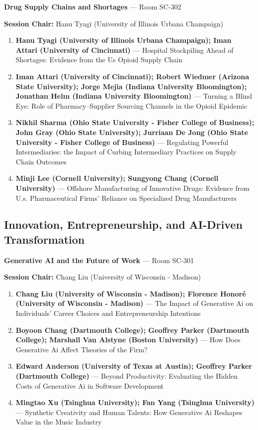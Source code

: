 \documentclass[
  10pt,
  letterpaper,
  DIV=11,
  numbers=noendperiod]{scrartcl}
\begin{document}
\textbf{Drug Supply Chains and Shortages} --- Room SC-302

\textbf{Session Chair:} Hanu Tyagi (University of Illinois Urbana
Champaign)

\begin{enumerate}
\def\labelenumi{\arabic{enumi}.}
\item
  \textbf{Hanu Tyagi (University of Illinois Urbana Champaign); Iman
  Attari (University of Cincinnati)} --- Hospital Stockpiling Ahead of
  Shortages: Evidence from the Us Opioid Supply Chain
\item
  \textbf{Iman Attari (University of Cincinnati); Robert Wiedmer
  (Arizona State University); Jorge Mejia (Indiana University
  Bloomington); Jonathan Helm (Indiana University Bloomington)} ---
  Turning a Blind Eye: Role of Pharmacy--Supplier Sourcing Channels in
  the Opioid Epidemic
\item
  \textbf{Nikhil Sharma (Ohio State University - Fisher College of
  Business); John Gray (Ohio State University); Jurriaan De Jong (Ohio
  State University - Fisher College of Business)} --- Regulating
  Powerful Intermediaries: the Impact of Curbing Intermediary Practices
  on Supply Chain Outcomes
\item
  \textbf{Minji Lee (Cornell University); Sungyong Chang (Cornell
  University)} --- Offshore Manufacturing of Innovative Drugs: Evidence
  from U.s. Pharmaceutical Firms' Reliance on Specialized Drug
  Manufacturers
\end{enumerate}

\subsection{\texorpdfstring{\textcolor{innovation}{Innovation, Entrepreneurship, and AI-Driven Transformation}}{}}\label{section-33}

\textbf{Generative AI and the Future of Work} --- Room SC-301

\textbf{Session Chair:} Chang Liu (University of Wisconsin - Madison)

\begin{enumerate}
\def\labelenumi{\arabic{enumi}.}
\item
  \textbf{Chang Liu (University of Wisconsin - Madison); Florence Honoré
  (University of Wisconsin - Madison)} --- The Impact of Generative Ai
  on Individuals' Career Choices and Entrepreneurship Intentions
\item
  \textbf{Boyoon Chang (Dartmouth College); Geoffrey Parker (Dartmouth
  College); Marshall Van Alstyne (Boston University)} --- How Does
  Generative Ai Affect Theories of the Firm?
\item
  \textbf{Edward Anderson (University of Texas at Austin); Geoffrey
  Parker (Dartmouth College)} --- Beyond Productivity: Evaluating the
  Hidden Costs of Generative Ai in Software Development
\item
  \textbf{Mingtao Xu (Tsinghua University); Fan Yang (Tsinghua
  University)} --- Synthetic Creativity and Human Talents: How
  Generative Ai Reshapes Value in the Music Industry
\end{enumerate}
\end{document}
